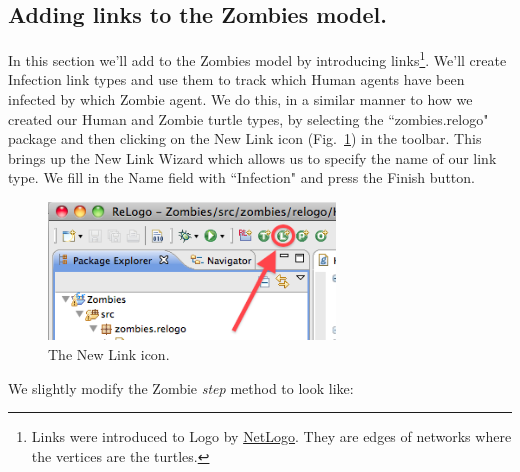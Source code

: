 \documentclass[11pt]{amsart}
\begin{document}
\clearpage
\subsection{Adding links to the Zombies model.}
In this section we'll add to the Zombies model by introducing links\footnote{Links were introduced to Logo by \href{http://ccl.northwestern.edu/netlogo/}{NetLogo}. They are edges of networks where the vertices are the turtles.}. We'll create Infection link types and use them to track which Human agents have been infected by which Zombie agent. We do this, in a similar manner to how we created our Human and Zombie turtle types, by selecting the ``zombies.relogo" package and then clicking on the New Link icon (Fig.~\ref{fig:newlinkicon}) in the toolbar. This brings up the New Link Wizard which allows us to specify the name of our link type. We fill in the Name field with ``Infection" and press the Finish button.

\begin{figure}
\begin{center}
\vspace{.2in}
\centerline {
\includegraphics[width=3in]{GettingStartedImages/NewLink.png}
}
\caption{The New Link icon.}
\label{fig:newlinkicon}
\end{center}
\end{figure}

We slightly modify the Zombie \emph{step} method to look like:
\end{document}
